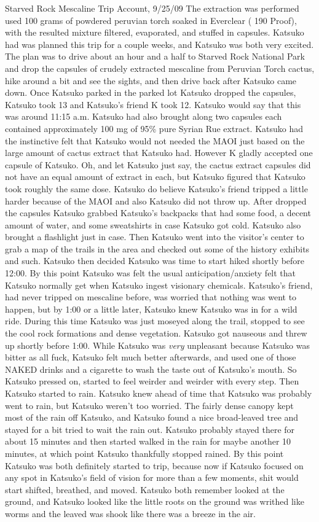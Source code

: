 \documentclass[12pt]{book}
\begin{document}
Starved Rock Mescaline Trip Account, 9/25/09 The extraction was performed used 100 grams of powdered peruvian torch soaked in Everclear ( 190 Proof), with the resulted mixture filtered, evaporated, and stuffed in capsules. Katsuko had was planned this trip for a couple weeks, and Katsuko was both very excited. The plan was to drive about an hour and a half to Starved Rock National Park and drop the capsules of crudely extracted mescaline from Peruvian Torch cactus, hike around a bit and see the sights, and then drive back after Katsuko came down. Once Katsuko parked in the parked lot Katsuko dropped the capsules, Katsuko took 13 and Katsuko's friend K took 12. Katsuko would say that this was around 11:15 a.m. Katsuko had also brought along two capsules each contained approximately 100 mg of 95\% pure Syrian Rue extract. Katsuko had the instinctive felt that Katsuko would not needed the MAOI just based on the large amount of cactus extract that Katsuko had. However K gladly accepted one capsule of Katsuko. Oh, and let Katsuko just say, the cactus extract capsules did not have an equal amount of extract in each, but Katsuko figured that Katsuko took roughly the same dose. Katsuko do believe Katsuko's friend tripped a little harder because of the MAOI and also Katsuko did not throw up. After dropped the capsules Katsuko grabbed Katsuko's backpacks that had some food, a decent amount of water, and some sweatshirts in case Katsuko got cold. Katsuko also brought a flashlight just in case. Then Katsuko went into the visitor's center to grab a map of the trails in the area and checked out some of the history exhibits and such. Katsuko then decided Katsuko was time to start hiked shortly before 12:00. By this point Katsuko was felt the usual anticipation/anxiety felt that Katsuko normally get when Katsuko ingest visionary chemicals. Katsuko's friend, had never tripped on mescaline before, was worried that nothing was went to happen, but by 1:00 or a little later, Katsuko knew Katsuko was in for a wild ride. During this time Katsuko was just moseyed along the trail, stopped to see the cool rock formations and dense vegetation. Katsuko got nauseous and threw up shortly before 1:00. While Katsuko was \emph{very} unpleasant because Katsuko was bitter as all fuck, Katsuko felt much better afterwards, and used one of those NAKED drinks and a cigarette to wash the taste out of Katsuko's mouth. So Katsuko pressed on, started to feel weirder and weirder with every step. Then Katsuko started to rain. Katsuko knew ahead of time that Katsuko was probably went to rain, but Katsuko weren't too worried. The fairly dense canopy kept most of the rain off Katsuko, and Katsuko found a nice broad-leaved tree and stayed for a bit tried to wait the rain out. Katsuko probably stayed there for about 15 minutes and then started walked in the rain for maybe another 10 minutes, at which point Katsuko thankfully stopped rained. By this point Katsuko was both definitely started to trip, because now if Katsuko focused on any spot in Katsuko's field of vision for more than a few moments, shit would start shifted, breathed, and moved. Katsuko both remember looked at the ground, and Katsuko looked like the little roots on the ground was writhed like worms and the leaved was shook like there was a breeze in the air. 
\end{document}
